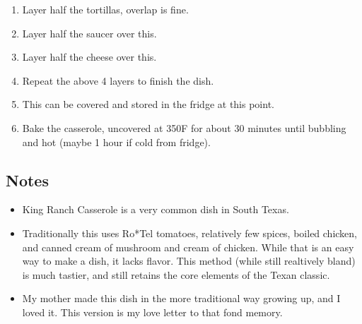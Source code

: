 \begin{multicols}{2}
\begin{enumerate}
    \item Layer half the tortillas, overlap is fine.
    \item Layer half the saucer over this.
    \item Layer half the cheese over this.
    \item Repeat the above 4 layers to finish the dish. 
    \item This can be covered and stored in the fridge at this point.
    \item Bake the casserole, uncovered at 350F for about 30 minutes until bubbling and hot (maybe 1 hour if cold from fridge).
\end{enumerate}

\subsection*{Notes}
\begin{itemize}
    \item King Ranch Casserole is a very common dish in South Texas.
    \item Traditionally this uses Ro*Tel tomatoes, relatively few spices, boiled chicken, and canned cream of mushroom and cream of chicken. While that is an easy way to make a dish, it lacks flavor. This method (while still realtively bland) is much tastier, and still retains the core elements of the Texan classic.
    \item My mother made this dish in the more traditional way growing up, and I loved it. This version is my love letter to that fond memory.
\end{itemize}
\end{multicols}
\clearpage